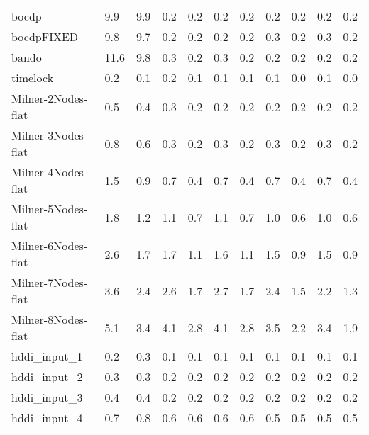 \begin{table}
\begin{adjustbox}{max totalheight=\textheight}
\begin{tabular}{|l|llllllllll|}
    bocdp              & 9.9      & 9.9      & 0.2      & 0.2      & 0.2      & 0.2      & 0.2      & 0.2      & 0.2      & 0.2      \\
    bocdpFIXED         & 9.8      & 9.7      & 0.2      & 0.2      & 0.2      & 0.2      & 0.3      & 0.2      & 0.3      & 0.2      \\
    bando              & 11.6     & 9.8      & 0.3      & 0.2      & 0.3      & 0.2      & 0.2      & 0.2      & 0.2      & 0.2      \\
    timelock           & 0.2      & 0.1      & 0.2      & 0.1      & 0.1      & 0.1      & 0.1      & 0.0      & 0.1      & 0.0      \\ \hline
    Milner-2Nodes-flat & 0.5      & 0.4      & 0.3      & 0.2      & 0.2      & 0.2      & 0.2      & 0.2      & 0.2      & 0.2      \\
    Milner-3Nodes-flat & 0.8      & 0.6      & 0.3      & 0.2      & 0.3      & 0.2      & 0.3      & 0.2      & 0.3      & 0.2      \\
    Milner-4Nodes-flat & 1.5      & 0.9      & 0.7      & 0.4      & 0.7      & 0.4      & 0.7      & 0.4      & 0.7      & 0.4      \\
    Milner-5Nodes-flat & 1.8      & 1.2      & 1.1      & 0.7      & 1.1      & 0.7      & 1.0      & 0.6      & 1.0      & 0.6      \\
    Milner-6Nodes-flat & 2.6      & 1.7      & 1.7      & 1.1      & 1.6      & 1.1      & 1.5      & 0.9      & 1.5      & 0.9      \\
    Milner-7Nodes-flat & 3.6      & 2.4      & 2.6      & 1.7      & 2.7      & 1.7      & 2.4      & 1.5      & 2.2      & 1.3      \\
    Milner-8Nodes-flat & 5.1      & 3.4      & 4.1      & 2.8      & 4.1      & 2.8      & 3.5      & 2.2      & 3.4      & 1.9      \\ \hline
    hddi\_input\_1     & 0.2      & 0.3      & 0.1      & 0.1      & 0.1      & 0.1      & 0.1      & 0.1      & 0.1      & 0.1      \\
    hddi\_input\_2     & 0.3      & 0.3      & 0.2      & 0.2      & 0.2      & 0.2      & 0.2      & 0.2      & 0.2      & 0.2      \\
    hddi\_input\_3     & 0.4      & 0.4      & 0.2      & 0.2      & 0.2      & 0.2      & 0.2      & 0.2      & 0.2      & 0.2      \\
    hddi\_input\_4     & 0.7      & 0.8      & 0.6      & 0.6      & 0.6      & 0.6      & 0.5      & 0.5      & 0.5      & 0.5      \\

\end{tabular}
\end{adjustbox}
\end{table}
